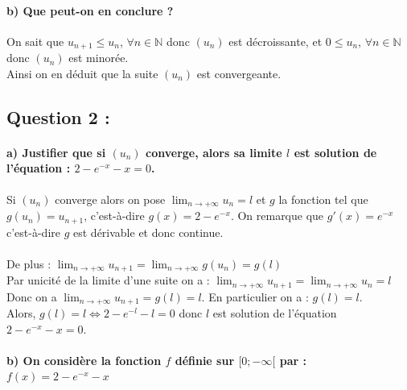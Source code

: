 \documentclass[a4paper, 12pt]{article}
\begin{document}
{}
\paragraph*{b) Que peut-on en conclure ?\\[5mm]}

On sait que $u_{n+1} \leq u_n$, $\forall n \in \mathbb{N}$ donc $(u_n)$ est décroissante, et $0 \leq u_n$, $\forall n \in \mathbb{N}$ donc $(u_n)$ est minorée. 
\\
Ainsi on en déduit que la suite $(u_n)$ est convergeante.

{}
\subsection*{Question 2 :}

{}
\paragraph*{a) Justifier que si $(u_n)$ converge, alors sa limite $l$ est solution de l'équation : $2 - e^{-x}-x=0$.\\[5mm]}

Si $(u_n)$ converge alors on pose $\displaystyle \lim_{n \to +\infty}u_n=l$ et $g$ la fonction tel que $g(u_n) = u_{n+1}$, c'est-à-dire $g(x) = 2 - e^{-x}$.
On remarque que $g'(x) = e^{-x}$ c'est-à-dire $g$ est dérivable et donc continue.
\\ \\
De plus : $\displaystyle \lim_{n \to +\infty} u_{n+1} = \displaystyle \lim_{n \to +\infty} g(u_n) = g(l)$ \\[2mm]
Par unicité de la limite d'une suite on a : $\displaystyle \lim_{n \to +\infty} u_{n+1} = \displaystyle \lim_{n \to +\infty} u_n = l$ \\[2mm]
Donc on a $\displaystyle \lim_{n \to +\infty} u_{n+1} = g(l) = l$. En particulier on a : $g(l) = l$.
\\
Alors, $g(l) = l \iff 2 - e^{-l} - l = 0$ donc $l$ est solution de l'équation $2 - e^{-x}-x=0$.

{}
\paragraph*{b) On considère la fonction $f$ définie sur $[0;-\infty[$ par : $f(x)=2-e^{-x}-x$\\[5mm]}
\end{document}
